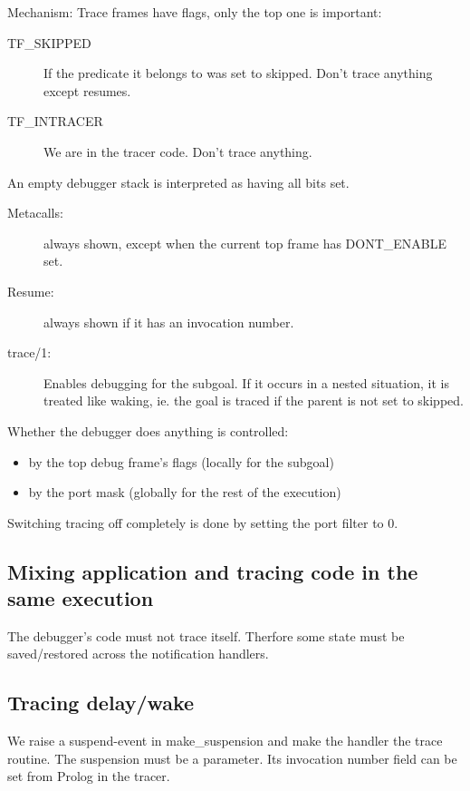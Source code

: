 Mechanism: Trace frames have flags, only the top one is important:
\begin{description}
\item[TF_SKIPPED] 
                If the predicate it belongs to was set to skipped.
                Don't trace anything except resumes.

\item[TF_INTRACER] 
                We are in the tracer code.
                Don't trace anything.
\end{description}
An empty debugger stack is interpreted as having all bits set.
\begin{description}

\item[Metacalls:]
    always shown, except when the current top frame has DONT_ENABLE set.

\item[Resume:]
    always shown if it has an invocation number.

\item[trace/1:]
    Enables debugging for the subgoal. If it occurs in a nested situation,
    it is treated like waking, ie. the goal is traced if the parent is
    not set to skipped.
\end{description}


Whether the debugger does anything is controlled:
\begin{itemize}
\item by the top debug frame's flags (locally for the subgoal)
\item by the port mask (globally for the rest of the execution)
\end{itemize}

Switching tracing off completely is done by setting the port filter to 0.


\subsection{Mixing application and tracing code in the same execution}

The debugger's code must not trace itself. Therfore
some state must be saved/restored across the notification handlers.



\subsection{Tracing delay/wake}

We raise a suspend-event in make_suspension and make the handler
the trace routine. The suspension must be a parameter.
Its invocation number field can be set from Prolog in the tracer.


